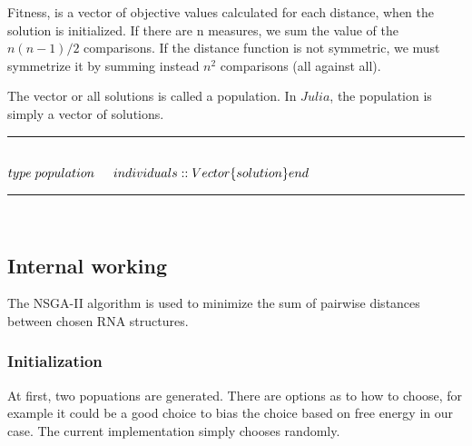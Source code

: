 \documentclass[a4paper, 12pt] {article}
\newcommand{\HRule}{\rule{\linewidth}{0.5mm}}
\begin{document}
Fitness, is a vector of objective values calculated for each distance, when the solution
is initialized. If there are n measures, we sum the value of the $n(n-1)/2$ comparisons. If the distance
function is not symmetric, we must symmetrize it by summing instead $n^2$ comparisons (all against all).


The vector or all solutions is called a population. In $Julia$, the population is simply a vector of
solutions.\\
\HRule \\[0.4cm]
\begin{math}
type \; population\\
\indent  individuals::Vector\{solution\}\\
end
\end{math}\\
\HRule \\[0.4cm]



\subsection*{Internal working}
\noindent
The NSGA-II algorithm is used to minimize the sum of pairwise distances between chosen RNA structures.


\subsubsection*{Initialization}
\noindent
At first, two popuations are generated. There are options as to how to choose, for example it could
be a good choice to bias the choice based on free energy in our case. The current implementation simply
chooses randomly.
\end{document}
